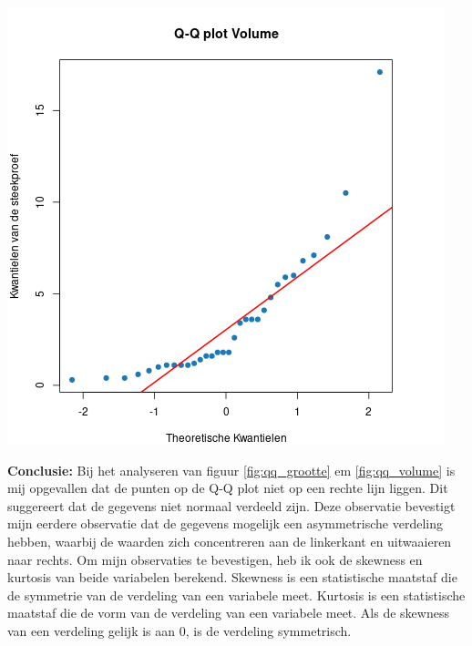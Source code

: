 \documentclass[12pt]{article}
\begin{document}
\noindent\begin{minipage}{0.5\linewidth}
    \centering
    \includegraphics[width=\linewidth]{vragen/vraag1/images/qq_volume.png}
    \label{fig:qq_volume}
\end{minipage}
\newline\newline\newline
\textbf{Conclusie:} Bij het analyseren van figuur \ref{fig:qq_grootte} em \ref{fig:qq_volume} is mij opgevallen dat de punten op de Q-Q plot niet op een rechte lijn liggen.
Dit suggereert dat de gegevens niet normaal verdeeld zijn.
Deze observatie bevestigt mijn eerdere observatie dat de gegevens mogelijk een asymmetrische verdeling hebben, waarbij de waarden zich concentreren aan de linkerkant en uitwaaieren naar rechts.
\newline\newline
Om mijn observaties te bevestigen, heb ik ook de skewness en kurtosis van beide variabelen berekend.
Skewness is een statistische maatstaf die de symmetrie van de verdeling van een variabele meet.
Kurtosis is een statistische maatstaf die de vorm van de verdeling van een variabele meet.
\newline\newline
Als de skewness van een verdeling gelijk is aan 0, is de verdeling symmetrisch.
\end{document}
